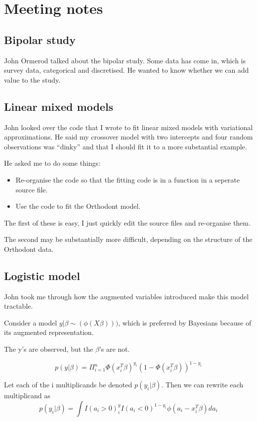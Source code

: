 \documentclass{amsart}
\begin{document}
\section{Meeting notes}
\subsection{Bipolar study}
John Ormerod talked about the bipolar study. Some data has come in, which is survey 
data, categorical and discretised. He wanted to know whether we can add value to
the study.

\subsection{Linear mixed models}
John looked over the code that I wrote to fit linear mixed models with variational
approximations. He said my crossover model with two intercepts and four random
observations was ``dinky'' and that I should fit it to a more substantial example.

He asked me to do some things:
\begin{itemize}
\item Re-organise the code so that the fitting code is in a function in a seperate
source file.
\item Use the code to fit the Orthodont model.
\end{itemize}

The first of these is easy, I just quickly edit the source files and re-organise
them.

The second may be substantially more difficult, depending on the structure of the
Orthodont data.

\subsection{Logistic model}
John took me through how the augmented variables introduced make this model
tractable.

Consider a model $y|\beta \sim \text{}(\phi(X\beta)))$, which is preferred by
Bayesians because of its augmented representation.

The y's are observed, but the $\beta$'s are not.

\[
p(y|\beta) = \Pi_{i=1}^n \Phi(x_i ^T \beta)^{y_i} (1 - \Phi(x_i ^T \beta))^{1 - y_i}
\]

Let each of the i multiplicands be denoted $p(y_i|\beta)$.
Then we can rewrite each multiplicand as
\[
	p(y_i|\beta) = \int I(a_i > 0)^y_i I(a_i < 0) ^{1-y_i} \phi(a_i - x_i^T \beta) d a_i
\]
\end{document}

